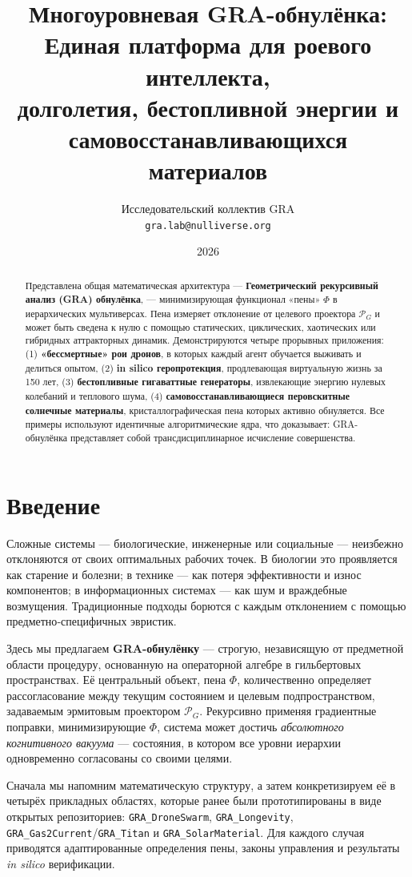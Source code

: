 \documentclass[12pt,a4paper]{article}
\title{\bfseries Многоуровневая GRA-обнулёнка: \\ Единая платформа для роевого интеллекта, \\ долголетия, бестопливной энергии и \\ самовосстанавливающихся материалов}
\author{Исследовательский коллектив GRA \\ \small\texttt{gra.lab@nulliverse.org}}
\date{2026}
\begin{document}
\maketitle

\begin{abstract}
Представлена общая математическая архитектура — \textbf{Геометрический рекурсивный анализ (GRA) обнулёнка}, — минимизирующая функционал «пены» $\Phi$ в иерархических мультиверсах. Пена измеряет отклонение от целевого проектора $\mathcal{P}_G$ и может быть сведена к нулю с помощью статических, циклических, хаотических или гибридных аттракторных динамик.
Демонстрируются четыре прорывных приложения:
(1) \textbf{«бессмертные» рои дронов}, в которых каждый агент обучается выживать и делиться опытом,
(2) \textbf{in silico геропротекция}, продлевающая виртуальную жизнь за 150 лет,
(3) \textbf{бестопливные гигаваттные генераторы}, извлекающие энергию нулевых колебаний и теплового шума,
(4) \textbf{самовосстанавливающиеся перовскитные солнечные материалы}, кристаллографическая пена которых активно обнуляется.
Все примеры используют идентичные алгоритмические ядра, что доказывает: GRA-обнулёнка представляет собой трансдисциплинарное исчисление совершенства.
\end{abstract}

\section{Введение}
Сложные системы — биологические, инженерные или социальные — неизбежно отклоняются от своих оптимальных рабочих точек.
В биологии это проявляется как старение и болезни; в технике — как потеря эффективности и износ компонентов; в информационных системах — как шум и враждебные возмущения.
Традиционные подходы борются с каждым отклонением с помощью предметно‑специфичных эвристик.

Здесь мы предлагаем \textbf{GRA-обнулёнку} — строгую, независящую от предметной области процедуру, основанную на операторной алгебре в гильбертовых пространствах.
Её центральный объект, пена $\Phi$, количественно определяет рассогласование между текущим состоянием и целевым подпространством, задаваемым эрмитовым проектором $\mathcal{P}_G$.
Рекурсивно применяя градиентные поправки, минимизирующие $\Phi$, система может достичь \textit{абсолютного когнитивного вакуума} — состояния, в котором все уровни иерархии одновременно согласованы со своими целями.

Сначала мы напомним математическую структуру, а затем конкретизируем её в четырёх прикладных областях, которые ранее были прототипированы в виде открытых репозиториев:
\texttt{GRA\_DroneSwarm},
\texttt{GRA\_Longevity},
\texttt{GRA\_Gas2Current}/\texttt{GRA\_Titan}
и \texttt{GRA\_SolarMaterial}.
Для каждого случая приводятся адаптированные определения пены, законы управления и результаты \textit{in silico} верификации.
\end{document}

